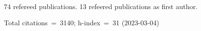 74 refereed publications. 13 refeered publications as first author.

Total citations~=~3140; h-index~=~31 (2023-03-04)